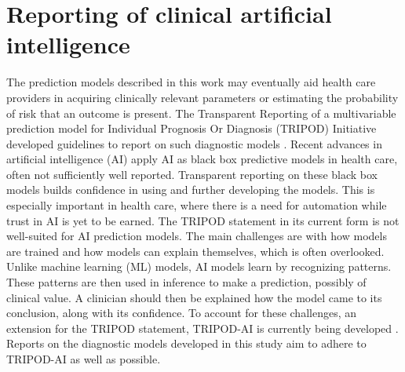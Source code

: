 \section{Reporting of clinical artificial intelligence}
The prediction models described in this work may eventually aid health care providers in acquiring clinically relevant parameters or estimating the probability of risk that an outcome is present.
The Transparent Reporting of a multivariable prediction model for Individual Prognosis Or Diagnosis (TRIPOD) Initiative developed guidelines to report on such diagnostic models .
Recent advances in artificial intelligence (AI) apply AI as black box predictive models in health care, often not sufficiently well reported.
Transparent reporting on these black box models builds confidence in using and further developing the models.
This is especially important in health care, where there is a need for automation while trust in AI is yet to be earned.
The TRIPOD statement in its current form is not well-suited for AI prediction models.
The main challenges are with how models are trained and how models can explain themselves, which is often overlooked.
Unlike machine learning (ML) models, AI models learn by recognizing patterns.
These patterns are then used in inference to make a prediction, possibly of clinical value.
A clinician should then be explained how the model came to its conclusion, along with its confidence.
To account for these challenges, an extension for the TRIPOD statement, TRIPOD-AI is currently being developed .
Reports on the diagnostic models developed in this study aim to adhere to TRIPOD-AI as well as possible.
